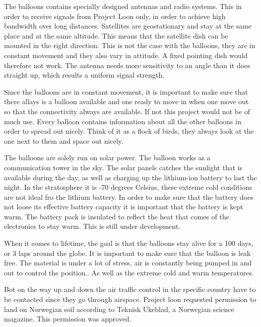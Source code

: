 The balloons contains specially designed antennas and radio systems. This in order to receive signals from Project Loon only, in order to achieve high bandwidth over long distances. Satellites are geostationary and stay at the same place and at the same altitude. This means that the satellite dish can be mounted in the right direction. This is not the case with the balloons, they are in constant movement and they also vary in attitude. A fixed pointing dish would therefore not work. The antenna needs more sensitivity to an angle than it does straight up, which results a uniform signal strength. 

Since the balloons are in constant movement, it is important to make sure that there allays is a balloon available and one ready to move in when one move out so that the connectivity always are available. If not this project would not be of much use. Every balloon contains information about all the other balloons in order to spread out nicely. Think of it as a flock of birds, they always look at the one next to them and space out nicely.

The balloons are solely run on solar power. The balloon works as a communication tower in the sky. The solar panels catches the sunlight that is available during the day, as well as charging up the lithium-ion battery to last the night. In the stratosphere it is -70 degrees Celsius, these extreme cold conditions are not ideal fro the lithium battery. In order to make sure that the battery does not loose its effective battery capacity it is important that the battery is kept warm. The battery pack is insulated to reflect the heat that comes of the electronics to stay warm. This is still under development. 

When it comes to lifetime, the goal is that the balloons stay alive for a 100 days, or 3 laps around the globe. It is important to make sure that the balloon is leak free. The material is under a lot of stress, air is constantly being pumped in and out to control the position.. As well as the extreme cold and warm temperatures. 

Bot on the way up and down the air traffic control in the specific country have to be contacted since they go through airspace. Project loon requested permission to land on Norwegian soil according to Teknisk Ukeblad, a Norwegian science magazine. This permission was approved. \cite{loonTU}

